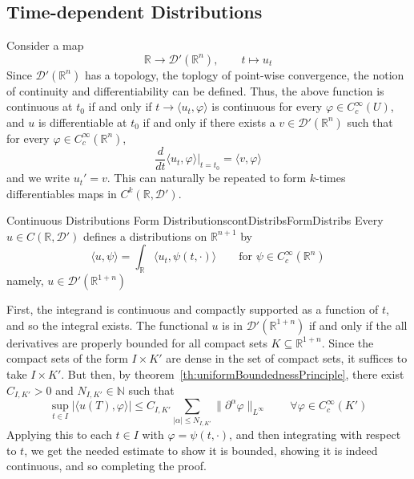 \documentclass{book}
\newenvironment{Proof}[1][]
  {\begin{ProofTcb}[#1]}
  {\end{ProofTcb}}
\newcommand{\N}{{\mathbb{N}}}
\newcommand{\R}{{\mathbb{R}}}
\newcommand{\CD}{{\mathcal{D}}}
\newcommand{\sse}{\subseteq}
\renewcommand{\phi}{\varphi}
\newcommand{\rw}{\rightarrow}
\begin{document}
\subsection{Time-dependent Distributions}

Consider a map
\[
	\R \rw \CD'(\R^n),\qquad t \mapsto u_t
\]
Since $\CD'(\R^n)$ has a topology, the toplogy of point-wise convergence, the notion of continuity and differentiability
can be defined. Thus, the above function is continuous at $t_0$ if and only if $t \rw \langle u_t, \phi\rangle$  is
continuous for every $\phi \in C_c^\infty(U)$, and $u$ is differentiable at $t_0$ if and only if there exists a $v \in
\CD'(\R^n)$ such that for every $\phi \in C_c^\infty(\R^n)$,
\[
	\frac{d}{dt} \left. \langle u_t, \phi\rangle\right|_{t = t_0} = \langle v, \phi\rangle
\]
and we write $u_t' = v$. This can naturally be repeated to form $k$-times differentiables maps in $C^k(\R, \CD')$.

\begin{prop}{Continuous Distributions Form Distributions}{contDistribsFormDistribs}
	Every $u \in C(\R, \CD')$ defines a distributions on $\R^{n+1}$ by
	\[
		\langle u, \psi \rangle = \int_\R \langle u_t, \psi(t, \cdot)\rangle \qquad \text{for $\psi \in C_c^\infty(\R^n)$}
	\]
	namely, $u \in \CD'(\R^{1+n})$
\end{prop}

\begin{Proof}
	First, the integrand is continuous and compactly supported as a function of $t$, and so the integral exists. The
	functional $u$ is in $\CD'(\R^{1+n})$ if and only if the all derivatives are properly bounded for all compact sets
	$K \sse \R^{1+n}$. Since the compact sets of the form $I\times K'$ are dense in the set of compact sets, it suffices
	to take $I\times K'$. But then, by theorem~\ref{th:uniformBoundednessPrinciple}, there exist $C_{I, K'} > 0$ and
	$N_{I, K'} \in \N$ such that
	\[
		\sup_{t \in I} |\langle u(T), \phi\rangle| \le C_{I, K'} \sum_{|\alpha| \le N_{I, K'}} \|  \partial^\alpha
		\phi\|_{L^\infty} \qquad \forall \phi \in C_c^\infty(K')
	\]
	Applying this to each $t \in I$ with $\phi = \psi(t, \cdot)$, and then integrating with respect to $t$, we get the
	needed estimate to show it is bounded, showing it is indeed continuous, and so completing the proof.
\end{Proof}
\end{document}
